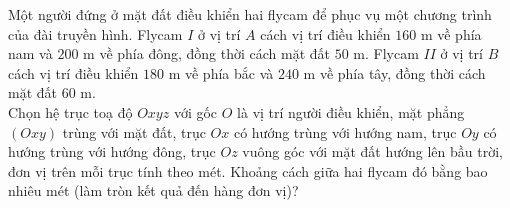 \begin{ex}%
	Một người đứng ở mặt đất điều khiển hai flycam để phục vụ một chương trình của đài truyền hình. Flycam $I$ ở vị trí $A$ cách vị trí điều khiển $160$ m về phía nam và $200$ m về phía đông, đồng thời cách mặt đất $50$ m. Flycam $II$ ở vị trí $B$ cách vị trí điều khiển $180$ m về phía bắc và $240$ m về phía tây, đồng thời cách mặt đất $60$ m.\\
	Chọn hệ trục toạ độ $Oxyz$ với gốc $O$ là vị trí người điều khiển, mặt phẳng $(Oxy)$ trùng với mặt đất, trục $Ox$ có hướng trùng với hướng nam, trục $Oy$ có hướng trùng với hướng đông, trục $Oz$ vuông góc với mặt đất hướng lên bầu trời, đơn vị trên mỗi trục tính theo mét. Khoảng cách giữa hai flycam đó bằng bao nhiêu mét (làm tròn kết quả đến hàng đơn vị)?
\end{ex}

